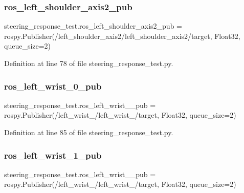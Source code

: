 \subsubsection{\texorpdfstring{ros\_left\_shoulder\_axis2\_pub}{ros\_left\_shoulder\_axis2\_pub}}
{\footnotesize\ttfamily steering\+\_\+response\+\_\+test.\+ros\+\_\+left\+\_\+shoulder\+\_\+axis2\+\_\+pub = rospy.\+Publisher(\textquotesingle{}/left\+\_\+shoulder\+\_\+axis2/left\+\_\+shoulder\+\_\+axis2/target\textquotesingle{}, Float32, queue\+\_\+size=2)}



Definition at line 78 of file steering\+\_\+response\+\_\+test.\+py.

\mbox{\label{namespacesteering__response__test_a3993d99a364e4c7ac9a9d87175d154a1}} 
\subsubsection{\texorpdfstring{ros\_left\_wrist\_0\_pub}{ros\_left\_wrist\_0\_pub}}
{\footnotesize\ttfamily steering\+\_\+response\+\_\+test.\+ros\+\_\+left\+\_\+wrist\+\_\+\_\+pub = rospy.\+Publisher(\textquotesingle{}/left\+\_\+wrist\+\_/left\+\_\+wrist\+\_/target\textquotesingle{}, Float32, queue\+\_\+size=2)}



Definition at line 85 of file steering\+\_\+response\+\_\+test.\+py.

\mbox{\label{namespacesteering__response__test_a57d0a11d86912a103adf6d4c5df7eece}} 
\subsubsection{\texorpdfstring{ros\_left\_wrist\_1\_pub}{ros\_left\_wrist\_1\_pub}}
{\footnotesize\ttfamily steering\+\_\+response\+\_\+test.\+ros\+\_\+left\+\_\+wrist\+\_\+\_\+pub = rospy.\+Publisher(\textquotesingle{}/left\+\_\+wrist\+\_/left\+\_\+wrist\+\_/target\textquotesingle{}, Float32, queue\+\_\+size=2)}



